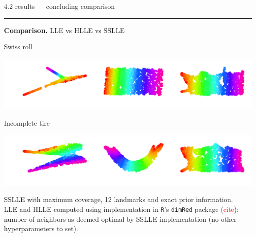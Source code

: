 \documentclass[11pt, compress, t, notes = noshow, xcolor = table, 
aspectratio = 1610]{beamer}
\begin{document}
\LARGE
\begin{frame}{\textcolor{gray!90}{4.2 results} ~~ concluding comparison}
\normalsize
\vspace{-0.5cm}
\noindent \textcolor{gray!90}{\rule{\textwidth}{1pt}}
\smallskip

\textbf{Comparison.} LLE vs HLLE vs SSLLE

\vspace{0.3cm}

\begin{minipage}[c]{0.2\textwidth}
  Swiss roll
\end{minipage}%
\begin{minipage}[c]{0.8\textwidth}
  \includegraphics[trim = 0 0 0 0, clip, %
    width = \textwidth]{figures/comparison_swiss}
\end{minipage}

\vspace{0.3cm}   

\begin{minipage}[c]{0.2\textwidth}
  Incomplete tire
\end{minipage}%
\begin{minipage}[c]{0.8\textwidth}
  \includegraphics[trim = 0 0 0 0, clip, %
    width = \textwidth]{figures/comparison_tire}
\end{minipage}


\vspace{0.3cm}  

\scriptsize
SSLLE with maximum coverage, 12 landmarks and exact prior information. \\
LLE and HLLE computed using implementation in \texttt{R}'s \texttt{dimRed} 
package (\textcolor{red}{cite}); number of neighbors as deemed optimal by 
SSLLE implementation (no other hyperparameters to set).

\end{frame}
\end{document}
